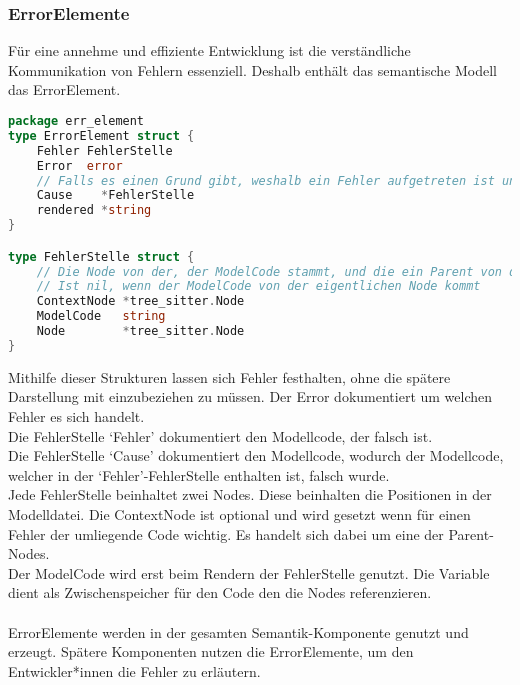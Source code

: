 \documentclass[./einleitung.tex]{subfiles}
\begin{document}
    \subsubsection{ErrorElemente}
    Für eine annehme und effiziente Entwicklung ist die verständliche Kommunikation von Fehlern essenziell.
    Deshalb enthält das semantische Modell das ErrorElement.
    \begin{lstlisting}[language=go]
package err_element
type ErrorElement struct {
	Fehler FehlerStelle
	Error  error
	// Falls es einen Grund gibt, weshalb ein Fehler aufgetreten ist und dieser Grund an einer anderen Stelle des Codes liegt
	Cause    *FehlerStelle
	rendered *string
}

type FehlerStelle struct {
	// Die Node von der, der ModelCode stammt, und die ein Parent von der eigentlichen Node ist.
	// Ist nil, wenn der ModelCode von der eigentlichen Node kommt
	ContextNode *tree_sitter.Node
	ModelCode   string
	Node        *tree_sitter.Node
}
    \end{lstlisting}
    Mithilfe dieser Strukturen lassen sich Fehler festhalten, ohne die spätere Darstellung mit einzubeziehen zu müssen.
    Der Error dokumentiert um welchen Fehler es sich handelt. \\
    Die FehlerStelle `Fehler' dokumentiert den Modellcode, der falsch ist. \\
    Die FehlerStelle `Cause' dokumentiert den Modellcode, wodurch der Modellcode, welcher in der `Fehler'-FehlerStelle enthalten ist, falsch wurde. \\
    Jede FehlerStelle beinhaltet zwei Nodes.
    Diese beinhalten die Positionen in der Modelldatei.
    Die ContextNode ist optional und wird gesetzt wenn für einen Fehler der umliegende Code wichtig.
    Es handelt sich dabei um eine der Parent-Nodes. \\
    Der ModelCode wird erst beim Rendern der FehlerStelle genutzt.
    Die Variable dient als Zwischenspeicher für den Code den die Nodes referenzieren. \\ \\
    ErrorElemente werden in der gesamten Semantik-Komponente genutzt und erzeugt.
    Spätere Komponenten nutzen die ErrorElemente, um den Entwickler*innen die Fehler zu erläutern.
\end{document}
